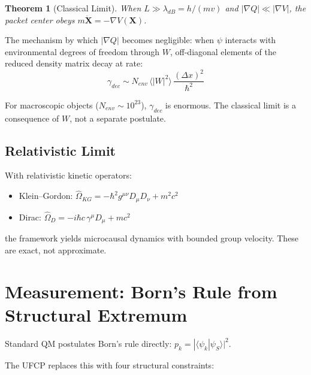 \documentclass[11pt, a4paper]{article}
\newtheorem{theorem}{Theorem}[section]
\begin{document}
\begin{theorem}[Classical Limit]
When $L \gg \lambda_{dB} = h/(mv)$ and $|\nabla Q| \ll |\nabla V|$,
the packet center obeys $m\ddot{\mathbf{X}} = -\nabla V(\mathbf{X})$.
\end{theorem}

The mechanism by which $|\nabla Q|$ becomes negligible: when $\psi$
interacts with environmental degrees of freedom through $W$,
off-diagonal elements of the reduced density matrix decay at rate:
\begin{equation}
  \gamma_{dec} \sim N_{env}\, \langle |W|^2 \rangle\,
  \frac{(\Delta x)^2}{\hbar^2}
\end{equation}

For macroscopic objects ($N_{env} \sim 10^{23}$), $\gamma_{dec}$ is
enormous. The classical limit is a consequence of $W$, not a separate
postulate.

\subsection{Relativistic Limit}

With relativistic kinetic operators:
\begin{itemize}[nosep]
  \item Klein--Gordon:
    $\hat{\Omega}_{KG} = -\hbar^2 g^{\mu\nu}D_\mu D_\nu + m^2 c^2$
  \item Dirac:
    $\hat{\Omega}_{D} = -i\hbar c\, \gamma^\mu D_\mu + mc^2$
\end{itemize}
the framework yields microcausal dynamics with bounded group velocity.
These are exact, not approximate.

\section{Measurement: Born's Rule from Structural Extremum}

Standard QM postulates Born's rule directly:
$p_k = |\langle \psi_k | \psi_S \rangle|^2$.

The UFCP replaces this with four structural constraints:
\end{document}
